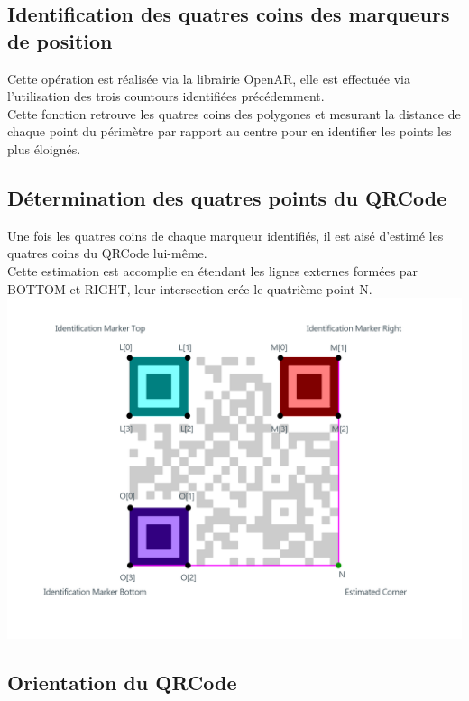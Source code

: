 \documentclass{report}
\begin{document}
		\subsection{Identification des quatres coins des marqueurs de position}

			Cette opération est réalisée via la librairie OpenAR, elle est effectuée via l'utilisation des trois countours identifiées précédemment.\\
			Cette fonction retrouve les quatres coins des polygones et mesurant la distance de chaque point du périmètre par rapport au centre pour en identifier les points les plus éloignés.\\

		\subsection{Détermination des quatres points du QRCode}

			Une fois les quatres coins de chaque marqueur identifiés, il est aisé d'estimé les quatres coins du QRCode lui-même.\\

			Cette estimation est accomplie en étendant les lignes externes formées par BOTTOM et RIGHT, leur intersection crée le quatrième point N.\\

			\includegraphics[scale=0.3]{naming.png}\\

		\subsection{Orientation du QRCode}
\end{document}
